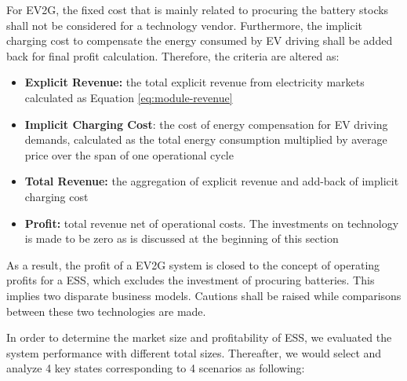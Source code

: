 For EV2G, the fixed cost that is mainly related to procuring the battery stocks shall not be considered for a technology vendor. Furthermore, the implicit charging cost to compensate the energy consumed by EV driving shall be added back for final profit calculation. Therefore, the criteria are altered as:
\begin{itemize}
	\item \textbf{Explicit Revenue:} the total explicit revenue from electricity markets calculated as Equation \eqref{eq:module-revenue}
	\item \textbf{Implicit Charging Cost}: the cost of energy compensation for EV driving demands, calculated as the total energy consumption multiplied by average price over the span of one operational cycle
	\item \textbf{Total Revenue:} the aggregation of explicit revenue and add-back of implicit charging cost
	\item \textbf{Profit:} total revenue net of operational costs. The investments on technology is made to be zero as is discussed at the beginning of this section 
\end{itemize}

As a result, the profit of a EV2G system is closed to the concept of operating profits for a ESS, which excludes the investment of procuring batteries. This implies two disparate business models. Cautions shall be raised while comparisons between these two technologies are made.

In order to determine the market size and profitability of ESS, we evaluated the system performance with different total sizes. Thereafter, we would select and analyze 4 key states corresponding to 4 scenarios as following:

